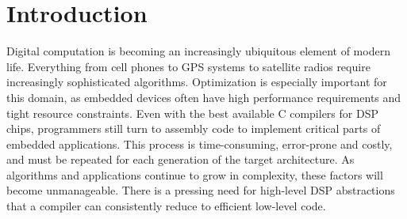  

\section{Introduction}
Digital computation is becoming an increasingly ubiquitous element of
modern life.  Everything from cell phones to GPS systems to satellite
radios require increasingly sophisticated algorithms.  Optimization is
especially important for this domain, as embedded devices often have
high performance requirements and tight resource constraints.  Even
with the best available C compilers for DSP chips, programmers still
turn to assembly code to implement critical parts of embedded
applications.  This process is time-consuming, error-prone and
costly, and must be repeated for each generation of the target
architecture.  As algorithms and applications continue to grow in
complexity, these factors will become unmanageable.  There is a
pressing need for high-level DSP abstractions that a compiler can
consistently reduce to efficient low-level code.

